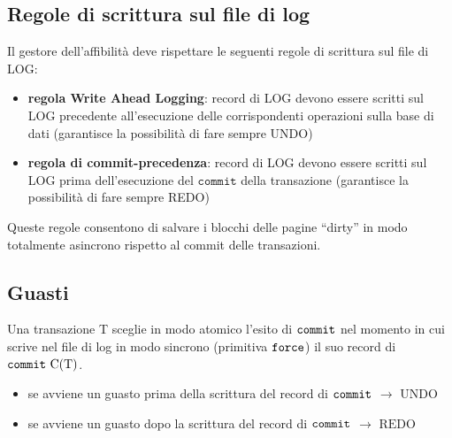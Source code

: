 \subsection{Regole di scrittura sul file di log}
Il gestore dell'affibilità deve rispettare le seguenti regole di scrittura sul file di LOG:
\begin{itemize}[label=$\Rightarrow$, itemsep=\smallskipamount]
  \item \textbf{regola Write Ahead Logging}: record di LOG devono essere scritti sul LOG precedente all'esecuzione delle corrispondenti operazioni sulla base di dati (garantisce la possibilità di fare sempre UNDO)
  \item \textbf{regola di commit-precedenza}: record di LOG devono essere scritti sul LOG prima dell'esecuzione del $\texttt{commit}$ della transazione (garantisce la possibilità di fare sempre REDO)
\end{itemize}

Queste regole consentono di salvare i blocchi delle pagine “dirty” in modo totalmente asincrono rispetto al commit delle transazioni.

\subsection{Guasti}
Una transazione T sceglie in modo atomico l'esito di $\verb|commit|$ nel momento in cui scrive nel file di log in modo sincrono (primitiva $\verb|force|$) il suo record di $\verb|commit| \ \mathrm{C(T)}$. 

\begin{itemize}[label=$\Rightarrow$, itemsep=\smallskipamount]
  \item se avviene un guasto prima della scrittura del record di $\verb|commit|$ $\rightarrow$ $\boldsymbol{\mathrm{UNDO}}$
  \item se avviene un guasto dopo la scrittura del record di $\verb|commit|$ $\rightarrow$ $\boldsymbol{\mathrm{REDO}}$
\end{itemize}

